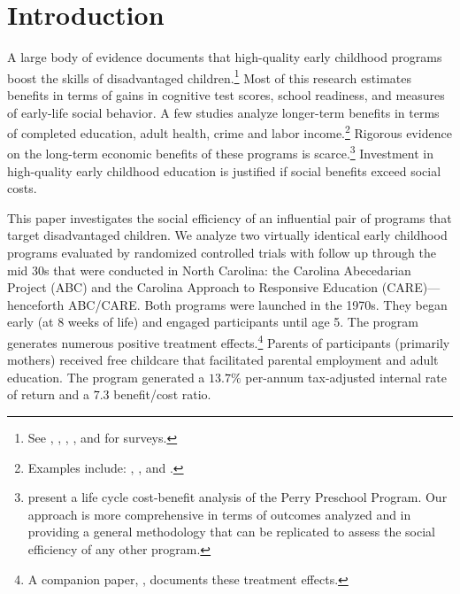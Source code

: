 \clearpage

\restoregeometry
\doublespacing
\setcounter{page}{1}

\section{Introduction}

\noindent A large body of evidence documents that high-quality early childhood programs boost the skills of disadvantaged children.\footnote{See \citet{Blau_Currie_2006_HEE}, \citet{Cunha_Heckman_ea_2006_HEE}, \citet{Duncan_Magnuson_2013_JEP}, \citet{Almond-Currie_2011_JEP}, and \citet{Elango_Hojman_etal_2016_Early-Edu} for surveys.} Most of this research estimates benefits in terms of gains in cognitive test scores, school readiness, and measures of early-life social behavior. A few studies analyze longer-term benefits in terms of completed education, adult health, crime and labor income.\footnote{Examples include: \citet{Heckman_Moon_etal_2010_QE}, \citet{Havnes_Mogstad_2011_AEJEP}, and \citet{Campbell_Conti_etal_2014_EarlyChildhoodInvestments}.} Rigorous evidence on the long-term economic benefits of these programs is scarce.\footnote{\citet{Heckman_Moon_etal_2010_RateofReturn} present a life cycle cost-benefit analysis of the Perry Preschool Program. Our approach is more comprehensive in terms of outcomes analyzed and in providing a general methodology that can be replicated to assess the social efficiency of any other program.} Investment in high-quality early childhood education is justified if social benefits exceed social costs.

This paper investigates the social efficiency of an influential pair of programs that target disadvantaged children. We analyze two virtually identical early childhood programs evaluated by randomized controlled trials with follow up through the mid 30s that were conducted in North Carolina: the Carolina Abecedarian Project (ABC) and the Carolina Approach to Responsive Education (CARE)---henceforth ABC/CARE. Both programs were launched in the 1970s. They began early (at 8 weeks of life) and engaged participants until age 5. The program generates numerous positive treatment effects.\footnote{A companion paper, \citet{Garcia_Heckman_Ziff_2017_Gender-Diff_UNPUBLISHED}, documents these treatment effects.} Parents of participants (primarily mothers) received free childcare that facilitated parental employment and adult education. The program generated a $13.7\%$ per-annum tax-adjusted internal rate of return and a $7.3$ benefit/cost ratio.

